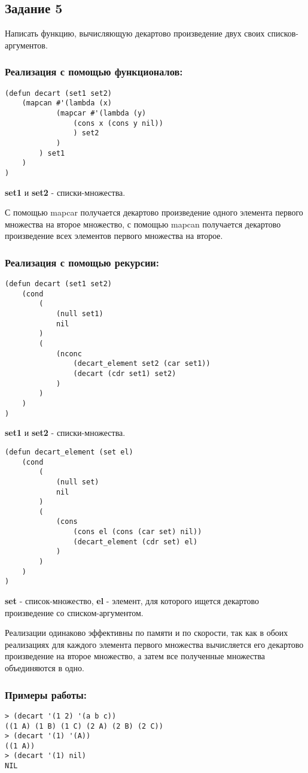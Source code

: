 \documentclass[a4paper,12pt]{article}
\begin{document}
\subsection*{Задание 5}

Написать функцию, вычисляющую декартово произведение двух своих списков-аргументов.

\subsubsection*{Реализация с помощью функционалов:}
\begin{lstlisting}[caption=Функция вычисления декартова произведения]
(defun decart (set1 set2)
	(mapcan #'(lambda (x)
			(mapcar #'(lambda (y) 
				(cons x (cons y nil))
				) set2
			)
		) set1
	)
)
\end{lstlisting}
\textbf{set1} и \textbf{set2} - списки-множества.

С помощью mapcar получается декартово произведение одного элемента первого множества на второе множество, с помощью mapcan получается декартово произведение всех элементов первого множества на второе.

\subsubsection*{Реализация с помощью рекурсии:}
\begin{lstlisting}[caption=Функция вычисления декартова произведения]
(defun decart (set1 set2)
	(cond
		(
			(null set1)
			nil
		)
		(
			(nconc 
				(decart_element set2 (car set1))
				(decart (cdr set1) set2)
			)
		)
	)
)
\end{lstlisting}
\textbf{set1} и \textbf{set2} - списки-множества.
\begin{lstlisting}[caption=Функция декартова произведения одного элемента на множество]
(defun decart_element (set el)
	(cond 
		(
			(null set)
			nil
		)
		(
			(cons 
				(cons el (cons (car set) nil))
				(decart_element (cdr set) el)
			)
		)
	)
)
\end{lstlisting}
\textbf{set} - список-множество, \textbf{el} - элемент, для которого ищется декартово произведение со списком-аргументом.

Реализации одинаково эффективны по памяти и по скорости, так как в обоих реализациях для каждого элемента первого множества вычисляется его декартово произведение на второе множество, а затем все полученные множества объединяются в одно.

\newpage
\subsubsection*{Примеры работы:}
\begin{lstlisting}
> (decart '(1 2) '(a b c))
((1 A) (1 B) (1 C) (2 A) (2 B) (2 C))
> (decart '(1) '(A))
((1 A))
> (decart '(1) nil)
NIL
\end{lstlisting}
\end{document}
